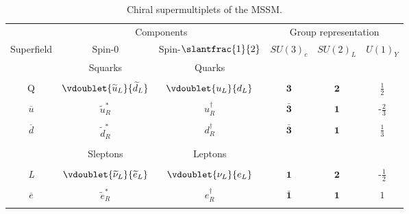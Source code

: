 \begin{table}
  \caption{Chiral supermultiplets of the MSSM.}
  \label{tab:chiral_supermultiplets}
  \begin{tabular}{cccccc}
    \toprule
                   & \multicolumn{2}{c}{Components}                  & \multicolumn{3}{c}{Group representation} \\ \cmidrule(r){2-3}\cmidrule(l){4-6}
    Superfield     & Spin-0                                          & Spin-$\slantfrac{1}{2}$                                                        & $SU(3)_c$          & $SU(2)_L$    & $U(1)_Y$\\\midrule
                   & Squarks                                         & Quarks                                                                         &                    &              & \\ \cmidrule(r){2-3}\\
    Q              & $\vdoublet{\widetilde{u}_L}{\widetilde{d}_L}$   & $\vdoublet{u_L}{d_L}$                                                          & $\mathbf{3}$       & $\mathbf{2}$ & $\frac{1}{2}$\\\\
    $\overline{u}$ & $\tilde{u}_R^*$                                 & $u_R^\dagger$                                                                  & $\bar{\mathbf{3}}$ & $\mathbf{1}$ & -$\frac{2}{3}$\\\\
    $\overline{d}$ & $\tilde{d}_R^*$                                 & $d_R^\dagger$                                                                  & $\bar{\mathbf{3}}$ & $\mathbf{1}$ & $\frac{1}{3}$\\\\\cmidrule{2-3}
                   & Sleptons                                        & Leptons                                                                        &                    &              & \\ \cmidrule{2-3}\\
    \emph{L}       & $\vdoublet{\widetilde{\nu}_L}{\widetilde{e}_L}$ & $\vdoublet{\nu_L}{e_L}$                                                        & $\mathbf{1}$       & $\mathbf{2}$ & -$\frac{1}{2}$\\\\
    $\overline{e}$ & $\tilde{e}_R^*$                                 & $e_R^\dagger$                                                                  & $\bar{\mathbf{1}}$ & $\mathbf{1}$ & $1$\\\\\cmidrule{2-3}

\end{tabular}
\end{table}
